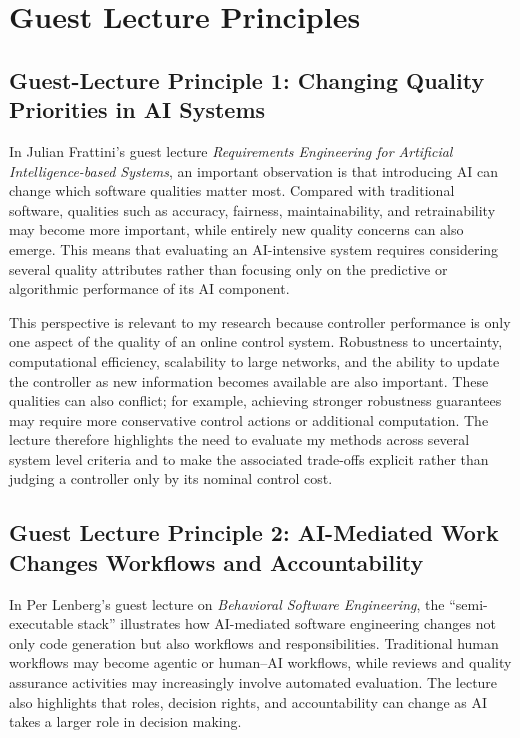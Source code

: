 \documentclass[11pt,a4paper]{article}
\begin{document}
\section{Guest Lecture Principles}



\subsection{Guest-Lecture Principle 1: Changing Quality Priorities in AI Systems}


In Julian Frattini's guest lecture \emph{Requirements Engineering for Artificial Intelligence-based Systems}, an important observation is that introducing AI can change which software qualities matter most. Compared with traditional software, qualities such as accuracy, fairness, maintainability, and retrainability may become more important, while entirely new quality concerns can also emerge. This means that evaluating an AI-intensive system requires considering several quality attributes rather than focusing only on the predictive or algorithmic performance of its AI component.

This perspective is relevant to my research because controller performance is only one aspect of the quality of an online control system. Robustness to uncertainty, computational efficiency, scalability to large networks, and the ability to update the controller as new information becomes available are also important. These qualities can also conflict; for example, achieving stronger robustness guarantees may require more conservative control actions or additional computation. The lecture therefore highlights the need to evaluate my methods across several system level criteria and to make the associated trade-offs explicit rather than judging a controller only by its nominal control cost.

\subsection{Guest Lecture Principle 2: AI-Mediated Work Changes Workflows and Accountability}


In Per Lenberg's guest lecture on \emph{Behavioral Software Engineering}, the ``semi-executable stack'' illustrates how AI-mediated software engineering changes not only code generation but also workflows and responsibilities. Traditional human workflows may become agentic or human--AI workflows, while reviews and quality assurance activities may increasingly involve automated evaluation. The lecture also highlights that roles, decision rights, and accountability can change as AI takes a larger role in decision making.
\end{document}
